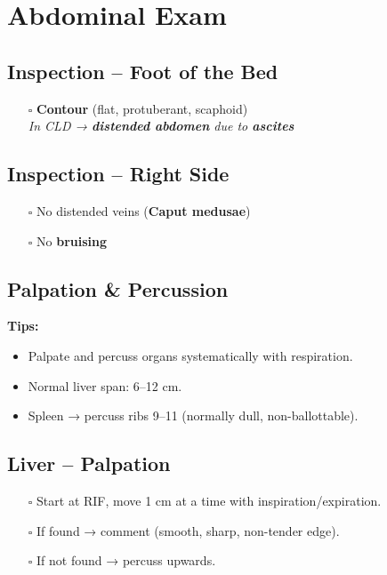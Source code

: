 \documentclass[
  13.5pt,
  a4paper,
  DIV=11,
  numbers=noendperiod]{scrreprt}
\providecommand{\tightlist}{%
  \setlength{\itemsep}{0pt}\setlength{\parskip}{0pt}}
\begin{document}
\section{Abdominal Exam}\label{abdominal-exam-1}

\subsection{Inspection -- Foot of the
Bed}\label{inspection-foot-of-the-bed-1}

\begin{itemize}
\tightlist
\item[$\square$]
  \textbf{Contour} (flat, protuberant, scaphoid)\\
  \emph{In CLD → \textbf{distended abdomen} due to \textbf{ascites}}
\end{itemize}

\subsection{Inspection -- Right Side}\label{inspection-right-side}

\begin{itemize}
\tightlist
\item[$\square$]
  No distended veins (\textbf{Caput medusae})
\item[$\square$]
  No \textbf{bruising}
\end{itemize}

\subsection{Palpation \& Percussion}\label{palpation-percussion}

\textbf{Tips:}

\begin{itemize}
\tightlist
\item
  Palpate and percuss organs systematically with respiration.
\item
  Normal liver span: 6--12 cm.
\item
  Spleen → percuss ribs 9--11 (normally dull, non-ballottable).
\end{itemize}

\subsection{Liver -- Palpation}\label{liver-palpation-1}

\begin{itemize}
\tightlist
\item[$\square$]
  Start at RIF, move 1 cm at a time with inspiration/expiration.
\item[$\square$]
  If found → comment (smooth, sharp, non-tender edge).\\
\item[$\square$]
  If not found → percuss upwards.
\end{itemize}
\end{document}
